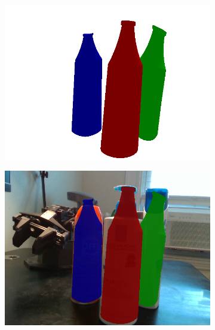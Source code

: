 \documentclass{article}
\begin{document}
\begin{figure}[]
\begin{subfigure}{(\linewidth - 0.05\linewidth)/5}
        \includegraphics[width=\linewidth]{figures/real2sim2real/8/3_sim.png}
        \caption{}
    \end{subfigure}
    \begin{subfigure}{(\linewidth - 0.05\linewidth)/5}
        \centering
        \includegraphics[width=\linewidth]{figures/real2sim2real/8/3.png}
        \caption{}
    \end{subfigure}
    \begin{subfigure}{(\linewidth - 0.05\linewidth)/5}
        \centering

\end{subfigure}
\end{figure}
\end{document}

